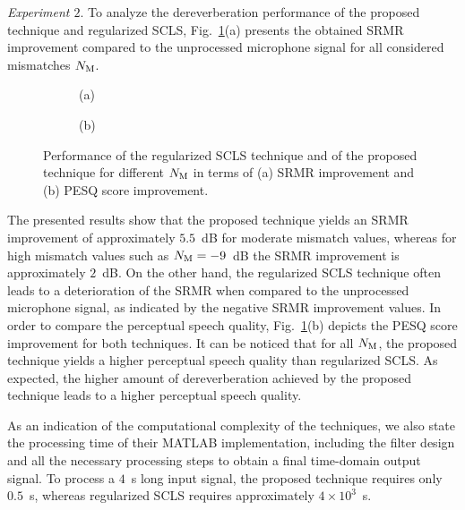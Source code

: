 \documentclass{article}
\begin{document}
{\it{Experiment $\mathit{2}$}}. \enspace
To analyze the dereverberation performance of the proposed technique and regularized SCLS, Fig.~\ref{fig: srmr}(a) presents the obtained SRMR improvement compared to the unprocessed microphone signal for all considered mismatches $N_{\rm M}$.
\begin{figure}[t!]
        \centering
        \begin{subfigure}[b]{0.25\textwidth}
                

                \hspace{2.1cm} (a)
        \end{subfigure}%
        \hspace{-0.7cm}
        \begin{subfigure}[b]{0.25\textwidth}
          
          
          \hspace{2.4cm} (b)
        \end{subfigure}
        
        \vspace{-0.18cm}
        \caption{Performance of the regularized SCLS technique and of the proposed technique for different $N_{\rm M}$ in terms of (a) SRMR improvement and (b) PESQ score improvement.}
        \vspace{-0.3cm}
        \label{fig: srmr}
\end{figure}
The presented results show that the proposed technique yields an SRMR improvement of approximately $5.5$~dB for moderate mismatch values, whereas for high mismatch values such as $N_{\rm M} = -9$~dB the SRMR improvement is approximately $2$~dB.
On the other hand, the regularized SCLS technique often leads to a deterioration of the SRMR when compared to the unprocessed microphone signal, as indicated by the negative SRMR improvement values.
In order to compare the perceptual speech quality, Fig.~\ref{fig: srmr}(b) depicts the PESQ score improvement for both techniques.
It can be noticed that for all $N_{\rm M}$, the proposed technique yields a higher perceptual speech quality than regularized SCLS. 
As expected, the higher amount of dereverberation achieved by the proposed technique leads to a higher perceptual speech quality.

As an indication of the computational complexity of the techniques, we also state the processing time of their MATLAB implementation, including the filter design and all the necessary processing steps to obtain a final time-domain output signal.
To process a $4$~s long input signal, the proposed technique requires only $0.5$~s, whereas regularized SCLS requires approximately $4 \times 10^3$~s.
\end{document}
